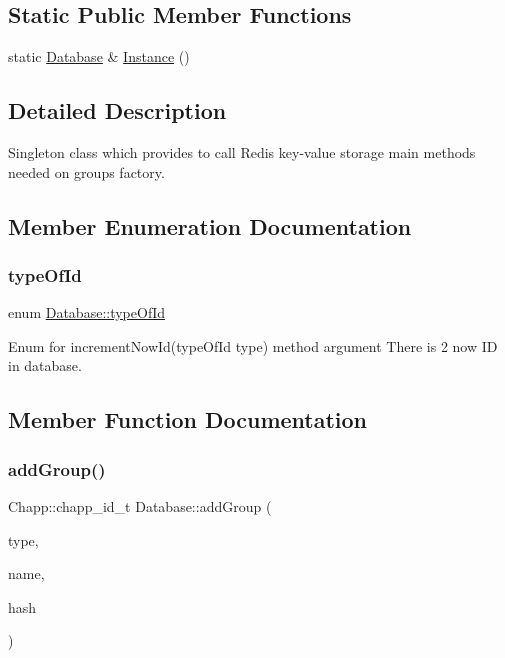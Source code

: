 \subsection*{Static Public Member Functions}
\begin{DoxyCompactItemize}
\item 
static \hyperlink{class_database}{Database} \& \hyperlink{class_database_aa0586187fb141218dfb7fd094e88ecef}{Instance} ()
\end{DoxyCompactItemize}


\subsection{Detailed Description}
Singleton class which provides to call Redis key-\/value storage main methods needed on groups factory. 

\subsection{Member Enumeration Documentation}
\mbox{\label{class_database_ad32ccd24dab0b01d6d932b17a98a8695}} 
\subsubsection{\texorpdfstring{type\+Of\+Id}{typeOfId}}
{\footnotesize\ttfamily enum \hyperlink{class_database_ad32ccd24dab0b01d6d932b17a98a8695}{Database\+::type\+Of\+Id}}

Enum for increment\+Now\+Id(type\+Of\+Id type) method argument There is 2 now ID in database. 

\subsection{Member Function Documentation}
\mbox{\label{class_database_a282bee9ff58e4c3e554552de4087f5ac}} 
\subsubsection{\texorpdfstring{add\+Group()}{addGroup()}}
{\footnotesize\ttfamily Chapp\+::chapp\+\_\+id\+\_\+t Database\+::add\+Group (\begin{DoxyParamCaption}\item[{Chapp\+::\+Group\+Type}]{type,  }\item[{std\+::string}]{name,  }\item[{std\+::string}]{hash }\end{DoxyParamCaption})}



